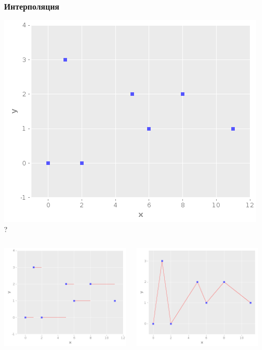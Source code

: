 \documentclass[rpussian]{beamer}
\begin{document}
\begin{frame}
  \frametitle{Интерполяция}
  \begin{center}
    \includegraphics[width=.4\textwidth,height=.4\textheight,keepaspectratio]{points}
    \\
    ?
  \end{center}
  \begin{columns}[c]
    \begin{column}{.35\textwidth}
      \includegraphics[width=\textwidth,height=\textheight,keepaspectratio]{interrupted}
    \end{column}
    \begin{column}{.35\textwidth}
      \includegraphics[width=\textwidth,height=\textheight,keepaspectratio]{linear_interpolation_1_var_small}

\end{column}
\end{columns}
\end{frame}
\end{document}
